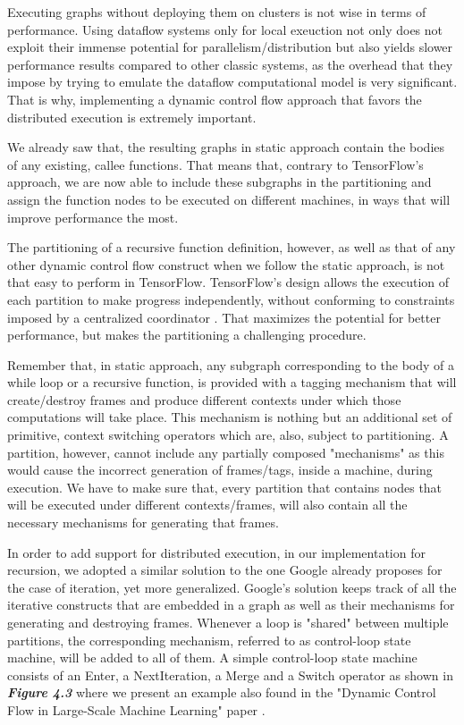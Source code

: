 \documentclass[ack,preface]{dithesis}
\begin{document}
Executing graphs without deploying them on clusters is not wise in terms of performance.  Using dataflow systems only for local exeuction not only does not exploit their immense potential  for parallelism/distribution but also yields slower performance results compared to other classic systems, as the overhead that they impose by trying to emulate the dataflow computational model is very significant. 
That is why, implementing a dynamic control flow approach that favors the distributed execution is extremely important. 

We already saw that, the resulting graphs in static approach contain the bodies of any existing, callee functions. That means that, contrary to TensorFlow's approach, we are now able to include these subgraphs in the partitioning and assign the function nodes to be executed on different machines, in ways that will improve performance the most.

The partitioning of a recursive function definition, however, as well as that of any other dynamic control flow construct  when we follow the static approach, is not that easy to perform in TensorFlow.
TensorFlow's design allows the execution of each partition to make progress independently, without conforming to constraints imposed by a centralized coordinator \cite{Yu:2018}. That maximizes the potential for better performance, but makes the partitioning a challenging procedure.

Remember that, in static approach, any subgraph corresponding to the body of a while loop or a recursive function, is provided with a tagging mechanism that will create/destroy frames and produce different contexts under which those computations will take place. This mechanism is nothing but an additional set of primitive, context switching operators which are, also, subject to partitioning. A partition, however, cannot include any partially composed "mechanisms" as this would cause the incorrect generation of frames/tags, inside a machine, during execution. We have to make sure that, every partition that contains nodes that will be executed under different contexts/frames, will also contain all the necessary mechanisms for generating that frames.

In order to add support for distributed execution, in our implementation for recursion, we adopted a similar solution to the one Google already proposes for the case of iteration, yet more generalized. Google's solution keeps track of all the iterative constructs that are embedded in a graph as well as their mechanisms for generating and destroying frames. Whenever a loop is "shared" between multiple partitions, the corresponding mechanism, referred to as control-loop state machine,  will be added to all of them. A simple control-loop state machine consists of an Enter, a NextIteration, a Merge and a Switch operator as shown in  \textit{\textbf{Figure 4.3}} where we present an example also found in the "Dynamic Control Flow in Large-Scale Machine Learning" paper \cite{Yu:2018}.
\end{document}
